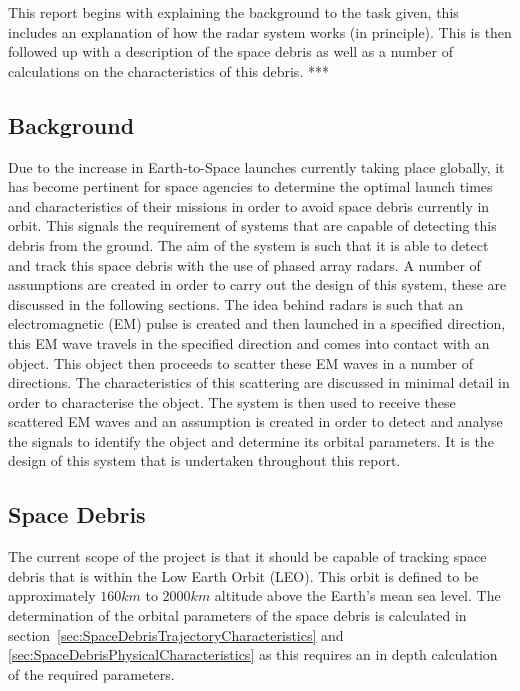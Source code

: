 \documentclass[11pt]{witseiepaper}
\begin{document}
This report begins with explaining the background to the task given, this includes an explanation of how the radar system works (in principle). This is then followed up with a description of the space debris as well as a number of calculations on the characteristics of this debris. ***





\subsection{Background} \label{sec:Background}
Due to the increase in Earth-to-Space launches currently taking place globally, it has become pertinent for space agencies to determine the optimal launch times and characteristics of their missions in order to avoid space debris currently in orbit. This signals the requirement of systems that are capable of detecting this debris from the ground.
The aim of the system is such that it is able to detect and track this space debris with the use of phased array radars.
A number of assumptions are created in order to carry out the design of this system, these are discussed in the following sections.
The idea behind radars is such that an electromagnetic (EM) pulse is created and then launched in a specified direction, this EM wave travels in the specified direction and comes into contact with an object. This object then proceeds to scatter these EM waves in a number of directions. The characteristics of this scattering are discussed in minimal detail in order to characterise the object. 
The system is then used to receive these scattered EM waves and an assumption is created in order to detect and analyse the signals to identify the object and determine its orbital parameters.
It is the design of this system that is undertaken throughout this report. 

\subsection{Space Debris} \label{sec:SpaceDebris}
The current scope of the project is that it should be capable of tracking space debris that is within the Low Earth Orbit (LEO). This orbit is defined to be approximately $160 km$ to $2000 km$ altitude above the Earth's mean sea level. 
The determination of the orbital parameters of the space debris is calculated in section~\ref{sec:SpaceDebrisTrajectoryCharacteristics} and \ref{sec:SpaceDebrisPhysicalCharacteristics} as this requires an in depth calculation of the required parameters.
\end{document}
